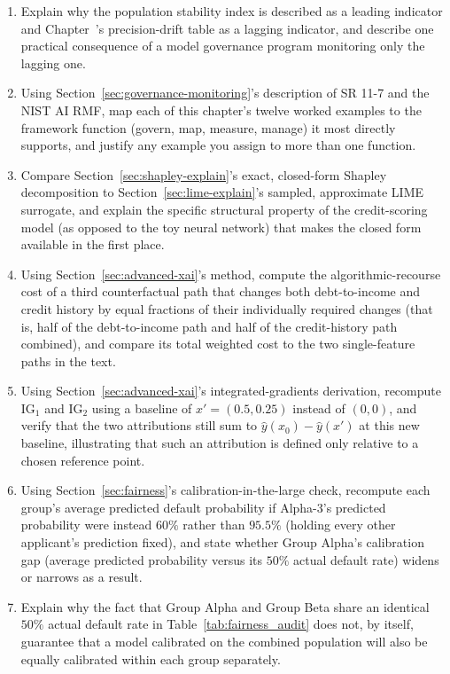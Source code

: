\documentclass[../ai_in_finance]{subfiles}
\begin{document}
\begin{enumerate}[exercises]
    \item Explain why the population stability index is described as a leading indicator and Chapter~'s precision-drift table as a lagging indicator, and describe one practical consequence of a model governance program monitoring only the lagging one.
    \item Using Section~\ref{sec:governance-monitoring}'s description of SR 11-7 and the NIST AI RMF, map each of this chapter's twelve worked examples to the framework function (govern, map, measure, manage) it most directly supports, and justify any example you assign to more than one function.
    \item Compare Section~\ref{sec:shapley-explain}'s exact, closed-form Shapley decomposition to Section~\ref{sec:lime-explain}'s sampled, approximate LIME surrogate, and explain the specific structural property of the credit-scoring model (as opposed to the toy neural network) that makes the closed form available in the first place.
    \item Using Section~\ref{sec:advanced-xai}'s method, compute the algorithmic-recourse cost of a third counterfactual path that changes both debt-to-income and credit history by equal fractions of their individually required changes (that is, half of the debt-to-income path and half of the credit-history path combined), and compare its total weighted cost to the two single-feature paths in the text.
    \item Using Section~\ref{sec:advanced-xai}'s integrated-gradients derivation, recompute $\text{IG}_1$ and $\text{IG}_2$ using a baseline of $x' = (0.5, 0.25)$ instead of $(0,0)$, and verify that the two attributions still sum to $\hat y(x_0) - \hat y(x')$ at this new baseline, illustrating that such an attribution is defined only relative to a chosen reference point.
    \item Using Section~\ref{sec:fairness}'s calibration-in-the-large check, recompute each group's average predicted default probability if Alpha-3's predicted probability were instead $60\%$ rather than $95.5\%$ (holding every other applicant's prediction fixed), and state whether Group Alpha's calibration gap (average predicted probability versus its $50\%$ actual default rate) widens or narrows as a result.
    \item Explain why the fact that Group Alpha and Group Beta share an identical $50\%$ actual default rate in Table~\ref{tab:fairness_audit} does not, by itself, guarantee that a model calibrated on the combined population will also be equally calibrated within each group separately.

\end{enumerate}
\end{document}
